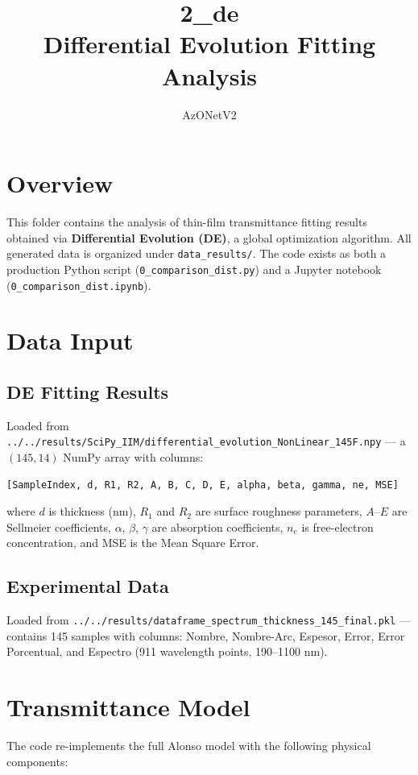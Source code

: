\documentclass[11pt,a4paper]{article}
\title{\textbf{2\_de} \\ Differential Evolution Fitting Analysis}
\author{AzONetV2}
\date{}
\begin{document}
\maketitle

\section{Overview}

This folder contains the analysis of thin-film transmittance fitting results obtained via \textbf{Differential Evolution (DE)}, a global optimization algorithm. All generated data is organized under {\tt data\_results/}. The code exists as both a production Python script ({\tt 0\_comparison\_dist.py}) and a Jupyter notebook ({\tt 0\_comparison\_dist.ipynb}).

\section{Data Input}

\subsection{DE Fitting Results}
Loaded from {\tt ../../results/SciPy\_IIM/differential\_evolution\_NonLinear\_145F.npy} --- a $(145, 14)$ NumPy array with columns:
\begin{verbatim}
[SampleIndex, d, R1, R2, A, B, C, D, E, alpha, beta, gamma, ne, MSE]
\end{verbatim}
where $d$ is thickness (nm), $R_1$ and $R_2$ are surface roughness parameters, $A$--$E$ are Sellmeier coefficients, $\alpha$, $\beta$, $\gamma$ are absorption coefficients, $n_e$ is free-electron concentration, and MSE is the Mean Square Error.

\subsection{Experimental Data}
Loaded from {\tt ../../results/dataframe\_spectrum\_thickness\_145\_final.pkl} --- contains 145 samples with columns: Nombre, Nombre-Arc, Espesor, Error, Error Porcentual, and Espectro (911 wavelength points, 190--1100 nm).

\section{Transmittance Model}

The code re-implements the full Alonso model with the following physical components:
\end{document}
